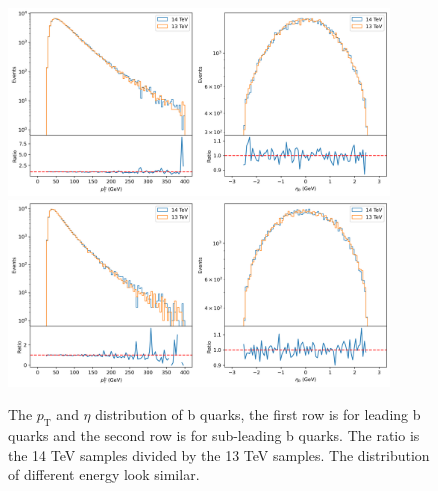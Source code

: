 \documentclass[12pt]{article}
\begin{document}
		\begin{figure}[htpb]
			\centering
			\includegraphics[width=0.9\textwidth]{pp4b-pt-eta-13-14TeV-1.png}
			\includegraphics[width=0.9\textwidth]{pp4b-pt-eta-13-14TeV-2.png}
			\caption{The $p_{\text{T}}$ and $\eta$ distribution of b quarks, the first row is for leading b quarks and the second row is for sub-leading b quarks. The ratio is the 14 TeV samples divided by the 13 TeV samples. The distribution of different energy look similar.}
			\label{fig:pp4b-pt-eta-13-14TeV}
		\end{figure}
\end{document}
